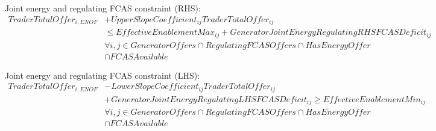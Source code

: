 \documentclass{article}
\begin{document}
%
%
%
%

Joint energy and regulating FCAS constraint (RHS):
\begin{equation}
\begin{split}
TraderTotalOffer_{i,ENOF} & + UpperSlopeCoefficient_{ij} TraderTotalOffer_{ij} \\
& \leq EffectiveEnablementMax_{ij} + GeneratorJointEnergyRegulatingRHSFCASDeficit_{ij} \\
& \forall i,j \in GeneratorOffers \cap RegulatingFCASOffers \cap HasEnergyOffer \\
& \cap FCASAvailable
\end{split}
\end{equation}

%
%
%
%

Joint energy and regulating FCAS constraint (LHS):
\begin{equation}
\begin{split}
TraderTotalOffer_{i,ENOF} & - LowerSlopeCoefficient_{ij} TraderTotalOffer_{ij} \\
& + GeneratorJointEnergyRegulatingLHSFCASDeficit_{ij} \geq EffectiveEnablementMin_{ij} \\
& \forall i,j \in GeneratorOffers \cap RegulatingFCASOffers \cap HasEnergyOffer \\
& \cap FCASAvailable \\
\end{split}
\end{equation}
\end{document}
